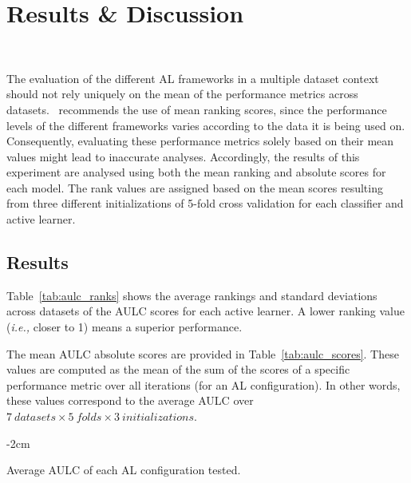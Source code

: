 \documentclass[preprint,12pt]{elsarticle}
\begin{document}
\section{Results \& Discussion}~\label{sec:results}

The evaluation of the different AL frameworks in a multiple dataset context
should not rely uniquely on the mean of the performance metrics across
datasets.~\cite{demvsar2006} recommends the use of mean ranking scores, since
the performance levels of the different frameworks varies according to the
data it is being used on. Consequently, evaluating these performance metrics
solely based on their mean values might lead to inaccurate analyses.
Accordingly, the results of this experiment are analysed using both the mean
ranking and absolute scores for each model. The rank values are assigned
based on the mean scores resulting from three different initializations of
5-fold cross validation for each classifier and active learner.

\subsection{Results}

Table~\ref{tab:aulc_ranks} shows the average rankings and standard deviations
across datasets of the AULC scores for each active learner. A lower ranking
value (\textit{i.e.,} closer to 1) means a superior performance.


The mean AULC absolute scores are provided in Table~\ref{tab:aulc_scores}.
These values are computed as the mean of the sum of the scores of a specific
performance metric over all iterations (for an AL configuration). In other
words, these values correspond to the average AULC over $7\ datasets \times 5\
folds \times 3\ initializations$.

\begin{table}[H]
    \centering
    \addtolength{\leftskip} {-2cm}
    \addtolength{\rightskip}{-2cm}
    \caption{\label{tab:aulc_scores}
        Average AULC of each AL configuration tested.
    }
\end{table}
\end{document}
